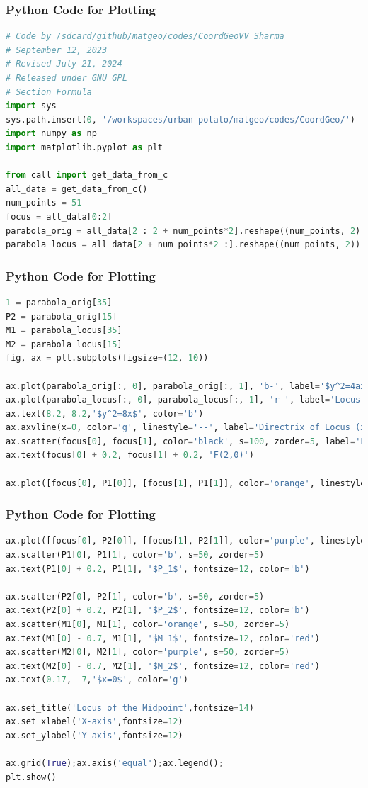 \documentclass{beamer}
\theoremstyle{remark}
\numberwithin{equation}{section}
\begin{document}
\begin{frame}[fragile]
\frametitle{Python Code for Plotting}
\begin{lstlisting}[language=Python]
# Code by /sdcard/github/matgeo/codes/CoordGeoVV Sharma
# September 12, 2023
# Revised July 21, 2024
# Released under GNU GPL
# Section Formula
import sys
sys.path.insert(0, '/workspaces/urban-potato/matgeo/codes/CoordGeo/') 
import numpy as np
import matplotlib.pyplot as plt

from call import get_data_from_c
all_data = get_data_from_c()
num_points = 51
focus = all_data[0:2]
parabola_orig = all_data[2 : 2 + num_points*2].reshape((num_points, 2))
parabola_locus = all_data[2 + num_points*2 :].reshape((num_points, 2))

\end{lstlisting}
\end{frame}
\begin{frame}[fragile]
\frametitle{Python Code for Plotting}
\begin{lstlisting}[language=Python]
1 = parabola_orig[35]
P2 = parabola_orig[15]
M1 = parabola_locus[35]
M2 = parabola_locus[15]
fig, ax = plt.subplots(figsize=(12, 10))

ax.plot(parabola_orig[:, 0], parabola_orig[:, 1], 'b-', label='$y^2=4ax(a=2)$')
ax.plot(parabola_locus[:, 0], parabola_locus[:, 1], 'r-', label='Locus(Midpoint) Parabola')
ax.text(8.2, 8.2,'$y^2=8x$', color='b')
ax.axvline(x=0, color='g', linestyle='--', label='Directrix of Locus (x=0)')
ax.scatter(focus[0], focus[1], color='black', s=100, zorder=5, label='Focus (F)')
ax.text(focus[0] + 0.2, focus[1] + 0.2, 'F(2,0)')

ax.plot([focus[0], P1[0]], [focus[1], P1[1]], color='orange', linestyle='--')
\end{lstlisting}
\end{frame}
\begin{frame}[fragile]
\frametitle{Python Code for Plotting}
\begin{lstlisting}[language=Python]
ax.plot([focus[0], P2[0]], [focus[1], P2[1]], color='purple', linestyle='--')
ax.scatter(P1[0], P1[1], color='b', s=50, zorder=5)
ax.text(P1[0] + 0.2, P1[1], '$P_1$', fontsize=12, color='b')

ax.scatter(P2[0], P2[1], color='b', s=50, zorder=5)
ax.text(P2[0] + 0.2, P2[1], '$P_2$', fontsize=12, color='b')
ax.scatter(M1[0], M1[1], color='orange', s=50, zorder=5)
ax.text(M1[0] - 0.7, M1[1], '$M_1$', fontsize=12, color='red')
ax.scatter(M2[0], M2[1], color='purple', s=50, zorder=5)
ax.text(M2[0] - 0.7, M2[1], '$M_2$', fontsize=12, color='red')
ax.text(0.17, -7,'$x=0$', color='g')

ax.set_title('Locus of the Midpoint',fontsize=14)
ax.set_xlabel('X-axis',fontsize=12)
ax.set_ylabel('Y-axis',fontsize=12)

ax.grid(True);ax.axis('equal');ax.legend();
plt.show()

\end{lstlisting}
\end{frame}
\end{document}
